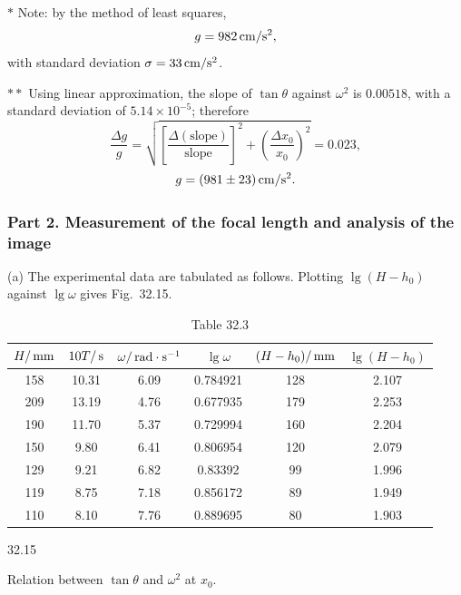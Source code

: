 $*$ Note: by the method of least squares,
\[
g=982\,\mathrm{cm/s^2},
\]
with standard deviation $\sigma=33\,\mathrm{cm/s^2}$.

$**$ Using linear approximation, the slope of $\tan\theta$ against $\omega^2$ is $0.00518$, with a standard deviation of $5.14\times10^{-5}$; therefore
\[
\frac{\Delta g}{g}=\sqrt{\left[\frac{\Delta(\text{slope})}{\text{slope}}\right]^2
+\left(\frac{\Delta x_0}{x_0}\right)^2}=0.023,
\]
\[
g=(981\pm23)\,\mathrm{cm/s^2}.
\]

\subsubsection*{Part 2. Measurement of the focal length and analysis of the image}

(a) The experimental data are tabulated as follows. Plotting $\lg(H-h_0)$ against $\lg\omega$ gives Fig.~32.15.

\begin{table}[h]
\centering
\small
\caption*{Table 32.3}
\begin{tabular}{|c|c|c|c|c|c|}
\hline
$H/\,\mathrm{mm}$ & $10T/\,\mathrm{s}$ & $\omega/\,\mathrm{rad\cdot s^{-1}}$ & $\lg\omega$ & $(H-h_0)/\,\mathrm{mm}$ & $\lg(H-h_0)$\\
\hline
158 & 10.31 & 6.09 & 0.784921 & 128 & 2.107\\
209 & 13.19 & 4.76 & 0.677935 & 179 & 2.253\\
190 & 11.70 & 5.37 & 0.729994 & 160 & 2.204\\
150 & 9.80 & 6.41 & 0.806954 & 120 & 2.079\\
129 & 9.21 & 6.82 & 0.83392 & 99 & 1.996\\
119 & 8.75 & 7.18 & 0.856172 & 89 & 1.949\\
110 & 8.10 & 7.76 & 0.889695 & 80 & 1.903\\
\hline
\end{tabular}
\end{table}

\begin{figbox}{32.15}

\smallskip
{\footnotesize Relation between $\tan\theta$ and $\omega^2$ at $x_0$.}
\end{figbox}

